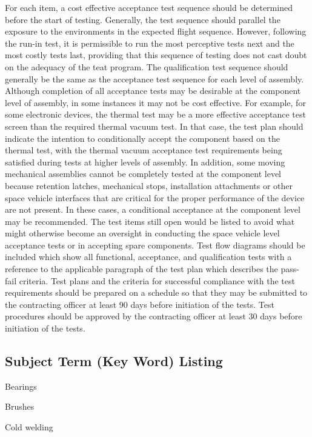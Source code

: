 \documentclass[12pt]{article}
\begin{document}
For each item, a cost effective acceptance test sequence should be determined before the start of testing. 
Generally, the test sequence should parallel the exposure to the environments in the expected flight sequence. 
However, following the run-in test, it is permissible to run the most perceptive tests next and the most costly tests last, providing that this sequence of testing does not cast doubt on the adequacy of the teat program. 
The qualification test sequence should generally be the same as the acceptance test sequence for each level of assembly. 
Although completion of all acceptance tests may be desirable at the component level of assembly, in some instances it may not be cost effective.
For example, for some electronic devices, the thermal test may be a more effective acceptance test screen than the required thermal vacuum test. 
In that case, the test plan should indicate the intention to conditionally accept the component based on the thermal test, with the thermal vacuum acceptance test requirements being satisfied during tests at higher levels of assembly. 
In addition, some moving mechanical assemblies cannot be completely tested at the component level because retention latches, mechanical stops, installation attachments or other space vehicle interfaces that are critical for the proper performance of the device are not present. 
In these cases, a conditional acceptance at the component level may be recommended. 
The test items still open would be listed to avoid what might otherwise become an oversight in conducting the space vehicle level acceptance tests or in accepting spare components. 
Test flow diagrams should be included which show all functional, acceptance, and qualification tests with a reference to the applicable paragraph of the test plan which describes the pass-fail criteria. 
Test plans and the criteria for successful compliance with the test requirements should be prepared on a schedule so that they may be submitted to the contracting officer at least 90 days before initiation of the tests. 
Test procedures should be approved by the contracting officer at least 30 days before initiation of the tests.

\subsection{Subject Term (Key Word) Listing} %

Bearings

Brushes

Cold welding
\end{document}
